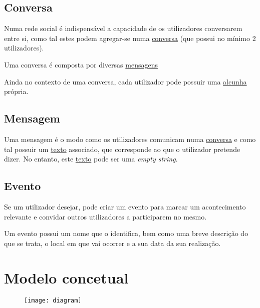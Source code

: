 \documentclass{report}
\begin{document}
\section{Conversa}

Numa rede social é indispensável a capacidade de os utilizadores conversarem entre si, como tal estes podem agregar-se numa \underline{conversa} (que possui no mínimo 2 utilizadores). \par

Uma conversa é composta por diversas \underline{mensagens}

Ainda no contexto de uma conversa, cada utilizador pode possuir uma \underline{alcunha} própria.

\section{Mensagem}

Uma mensagem é o modo como os utilizadores comunicam numa \underline{conversa} e como tal possuir um \underline{texto} associado, que corresponde ao que o utilizador pretende dizer. No entanto, este \underline{texto} pode ser uma \textit{empty string}.

\section{Evento}

Se um utilizador desejar, pode criar um evento para marcar um acontecimento relevante e convidar outros utilizadores a participarem no mesmo. \par

Um evento possui um nome que o identifica, bem como uma breve descrição do que se trata, o local em que vai ocorrer e a sua data da sua realização.

\chapter{Modelo concetual}

\begin{figure}[H]
    \centering
    \texttt{[image: diagram]}
\end{figure}
\end{document}
